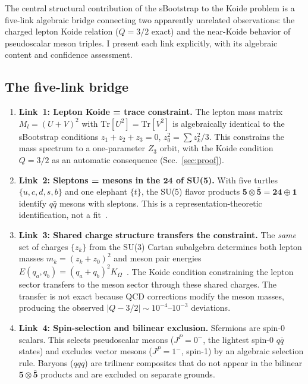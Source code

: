 \documentclass[prd,twocolumn,superscriptaddress,nofootinbib]{revtex4-2}
\newcommand{\Tr}{\mathrm{Tr}}
\begin{document}
The central structural contribution of the sBootstrap to the
Koide problem is a five-link algebraic bridge connecting two apparently
unrelated observations: the charged lepton Koide relation ($Q=3/2$
exact) and the near-Koide behavior of pseudoscalar meson triples.  I
present each link explicitly, with its algebraic content and confidence
assessment.

\subsection{The five-link bridge}
\label{sec:five-links}

\begin{enumerate}
\item \textbf{Link~1: Lepton Koide = trace constraint.}
The lepton mass matrix $M_l=(U+V)^2$ with $\Tr[U^2]=\Tr[V^2]$ is
algebraically identical to the sBootstrap conditions
$z_1+z_2+z_3=0$, $z_0^2=\sum z_k^2/3$.  This constrains the mass
spectrum to a one-parameter $Z_3$ orbit, with the Koide condition
$Q=3/2$ as an automatic consequence
(Sec.~\ref{sec:proof}).

\item \textbf{Link~2: Sleptons = mesons in the $\mathbf{24}$ of
SU(5).}
With five turtles $\{u,c,d,s,b\}$ and one elephant $\{t\}$, the
SU(5) flavor products
$\mathbf{5}\otimes\bar{\mathbf{5}}=\mathbf{24}\oplus\mathbf{1}$
identify $q\bar{q}$ mesons with sleptons.  This is a
representation-theoretic identification, not a
fit~\cite{Rivero2009sboot}.

\item \textbf{Link~3: Shared charge structure transfers the
constraint.}
The \emph{same} set of charges $\{z_k\}$ from the SU(3) Cartan
subalgebra determines both lepton masses
$m_k=(z_k+z_0)^2$ and meson pair energies
$E(q_a,q_b)=(q_a+q_b)^2 K_\Omega$~\cite{Rivero2024so32}.  The Koide
condition constraining the lepton sector transfers to the meson sector
through these shared charges.  The transfer is not exact because QCD
corrections modify the meson masses, producing the observed
$|Q-3/2|\sim 10^{-4}\text{--}10^{-3}$ deviations.

\item \textbf{Link~4: Spin-selection and bilinear exclusion.}
Sfermions are spin-0 scalars.  This selects pseudoscalar mesons
($J^P=0^-$, the lightest spin-0 $q\bar{q}$ states) and excludes
vector mesons ($J^P=1^-$, spin-1) by an algebraic selection rule.
Baryons ($qqq$) are trilinear composites that do not appear in the
bilinear $\mathbf{5}\otimes\bar{\mathbf{5}}$ products and are
excluded on separate grounds.


\end{enumerate}
\end{document}

